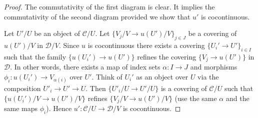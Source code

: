 \begin{proof}
The commutativity of the first diagram is clear.
It implies the commutativity of the second diagram provided we
show that $u'$ is cocontinuous.

\medskip\noindent
Let $U'/U$ be an object of $\mathcal{C}/U$.
Let $\{V_j/V \to u(U')/V\}_{j \in J}$ be a covering of $u(U')/V$
in $\mathcal{D}/V$. Since $u$ is cocontinuous there exists a
covering $\{U_i' \to U'\}_{i \in I}$ such that the family
$\{u(U_i') \to u(U')\}$ refines the covering
$\{V_j \to u(U')\}$ in $\mathcal{D}$. In other words, there exists
a map of index sets $\alpha : I \to J$ and morphisms
$\phi_i : u(U_i') \to V_{\alpha(i)}$ over $U'$.
Think of $U_i'$ as an object over
$U$ via the composition $U'_i \to U' \to U$. Then
$\{U'_i/U \to U'/U\}$ is a covering of $\mathcal{C}/U$ such that
$\{u(U_i')/V \to u(U')/V\}$ refines $\{V_j/V \to u(U')/V\}$
(use the same $\alpha$ and the same maps $\phi_i$). Hence
$u' : \mathcal{C}/U \to \mathcal{D}/V$ is cocontinuous.
\end{proof}

